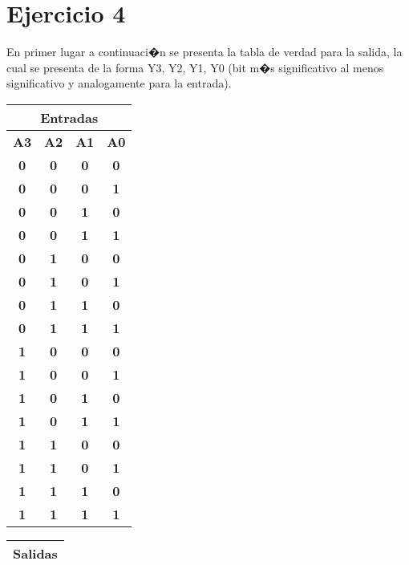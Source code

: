 
\section*{Ejercicio 4}
En primer lugar a continuaci�n se presenta la tabla de verdad para la salida, la cual se presenta de la forma Y3, Y2, Y1, Y0 (bit m�s significativo al menos significativo y analogamente para la entrada).
\begin{table}[htb] 
\centering  
\begin{tabular}{|c|c|c|c|}  
\hline  
\multicolumn{4}{|c|}{\textbf{Entradas}} \\ \hline  
\textbf{A3} & \textbf{A2} & \textbf{A1} & \textbf{A0} \\ \hline  
\textbf{0} & \textbf{0} & \textbf{0} & \textbf{0} \\ \hline  
\textbf{0} & \textbf{0} & \textbf{0} & \textbf{1} \\ \hline  
\textbf{0} & \textbf{0} & \textbf{1} & \textbf{0} \\ \hline  
\textbf{0} & \textbf{0} & \textbf{1} & \textbf{1} \\ \hline  
\textbf{0} & \textbf{1} & \textbf{0} & \textbf{0} \\ \hline  
\textbf{0} & \textbf{1} & \textbf{0} & \textbf{1} \\ \hline  
\textbf{0} & \textbf{1} & \textbf{1} & \textbf{0} \\ \hline  
\textbf{0} & \textbf{1} & \textbf{1} & \textbf{1} \\ \hline  
\textbf{1} & \textbf{0} & \textbf{0} & \textbf{0} \\ \hline  
\textbf{1} & \textbf{0} & \textbf{0} & \textbf{1} \\ \hline  
\textbf{1} & \textbf{0} & \textbf{1} & \textbf{0} \\ \hline  
\textbf{1} & \textbf{0} & \textbf{1} & \textbf{1} \\ \hline  
\textbf{1} & \textbf{1} & \textbf{0} & \textbf{0} \\ \hline  
\textbf{1} & \textbf{1} & \textbf{0} & \textbf{1} \\ \hline  
\textbf{1} & \textbf{1} & \textbf{1} & \textbf{0} \\ \hline  
\textbf{1} & \textbf{1} & \textbf{1} & \textbf{1} \\ \hline  
\end{tabular}  
\begin{tabular}{|c|c|c|c|} \hline 
\multicolumn{4}{|c|}{\textbf{Salidas}}                \\ \hline  

\end{tabular}
\end{table}
